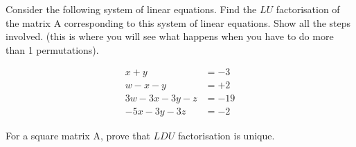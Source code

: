 \documentclass[solution,addpoints,12pt]{exam}
\begin{document}
\begin{questions}

\question[2] 



Consider the following system of linear equations. Find the $LU$ factorisation of the matrix A corresponding to this system of linear equations. Show all the steps involved. (this is where you will see what happens when you have to do more than 1 permutations).

\begin{align*}
x + y   &=  -3\\
w -x - y         &= +2\\
3w - 3x - 3y  -z   &= -19\\
 -5x -3y -3z  &=  -2 
\end{align*}

\begin{solution}

\end{solution}

\question[1] 
For a square matrix A, prove that $LDU$ factorisation is unique.
\begin{solution}

\end{solution}


\end{questions}
\end{document}
